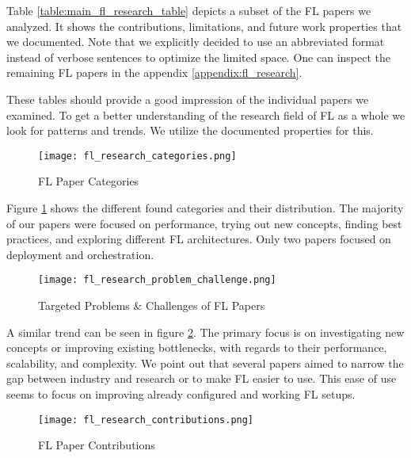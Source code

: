 \begin{figure}[p]
    
\end{figure}

Table \ref{table:main_fl_research_table} depicts a subset of the FL papers we analyzed.
It shows the contributions, limitations, and future work properties that we documented.
Note that we explicitly decided to use an abbreviated format instead of verbose sentences
to optimize the limited space.
One can inspect the remaining FL papers in the appendix \ref{appendix:fl_research}.

These tables should provide a good impression of the individual papers we examined.
To get a better understanding of the research field of FL as a whole we look for patterns and trends.
We utilize the documented properties for this.

\begin{figure}[h]
    \centering
    \texttt{[image: fl\_research\_categories.png]}
    \caption{FL Paper Categories}
    \label{fig:fl_research_categories}
\end{figure}

Figure \ref{fig:fl_research_categories} shows the different found categories and their distribution.
The majority of our papers were focused on performance, trying out new concepts, finding best practices,
and exploring different FL architectures.
Only two papers focused on deployment and orchestration.

\begin{figure}[h]
    \centering
    \texttt{[image: fl\_research\_problem\_challenge.png]}
    \caption{Targeted Problems \& Challenges of FL Papers}
    \label{fig:fl_research_problem_challenge}
\end{figure}

A similar trend can be seen in figure \ref{fig:fl_research_problem_challenge}.
The primary focus is on investigating new concepts or improving existing bottlenecks,
with regards to their performance, scalability, and complexity.
We point out that several papers aimed to narrow the gap between industry and research or
to make FL easier to use.
This ease of use seems to focus on improving already configured and working FL setups.

\begin{figure}[h]
    \centering
    \texttt{[image: fl\_research\_contributions.png]}
    \caption{FL Paper Contributions}
    \label{fig:fl_research_contributions}
\end{figure}

